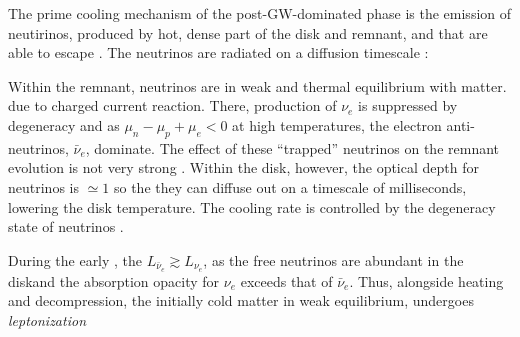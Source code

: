 The prime cooling mechanism of the post-\ac{GW}-dominated phase is the emission of 
neutirinos, produced by hot, dense part of the disk and remnant, and that are 
able to escape \cite{82,83,14}. 
The neutrinos are radiated on a diffusion timescale \cite{84}:

Within the remnant, neutrinos are in weak and thermal equilibrium with matter.
due to charged current reaction. There, production of $\nu_e$ is suppressed by 
degeneracy and as $\mu_n-\mu_p+\mu_e<0$ at high temperatures, the electron 
anti-neutrinos, $\bar{\nu}_{e}$, dominate. The effect of these ``trapped'' 
neutrinos on the remnant evolution is not very strong \cite{16,70}.
%
Within the disk, however, the optical depth for neutrinos is ${\simeq}1$ so 
the they can diffuse out on a timescale of milliseconds, lowering the disk 
temperature. The cooling rate is controlled by the degeneracy state of neutrinos 
\cite{85}.

During the early \pmerg{}, the $L_{\bar{\nu}_e}\gtrsim L_{\nu_e}$, as the 
free neutrinos are abundant in the diskand the absorption opacity for $\nu_e$ 
exceeds that of $\bar{\nu}_e$.
Thus, alongside heating and decompression, the initially cold matter in weak 
equilibrium, undergoes \textit{leptonization} 
\cite{84,86}

